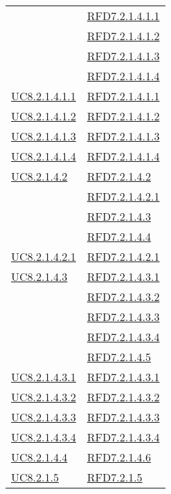 \begin{longtable}{|>{\centering}m{5cm}|m{5cm}<{\centering}|}
& \hyperlink{RFD7.2.1.4.1.1}{RFD7.2.1.4.1.1}\\
& \hyperlink{RFD7.2.1.4.1.2}{RFD7.2.1.4.1.2}\\
& \hyperlink{RFD7.2.1.4.1.3}{RFD7.2.1.4.1.3}\\
& \hyperlink{RFD7.2.1.4.1.4}{RFD7.2.1.4.1.4}\\ \hline
\hyperref[UC8.2.1.4.1.1]{UC8.2.1.4.1.1} & \hyperlink{RFD7.2.1.4.1.1}{RFD7.2.1.4.1.1}\\ \hline
\hyperref[UC8.2.1.4.1.2]{UC8.2.1.4.1.2} & \hyperlink{RFD7.2.1.4.1.2}{RFD7.2.1.4.1.2}\\ \hline
\hyperref[UC8.2.1.4.1.3]{UC8.2.1.4.1.3} & \hyperlink{RFD7.2.1.4.1.3}{RFD7.2.1.4.1.3}\\ \hline
\hyperref[UC8.2.1.4.1.4]{UC8.2.1.4.1.4} & \hyperlink{RFD7.2.1.4.1.4}{RFD7.2.1.4.1.4}\\ \hline
\hyperref[UC8.2.1.4.2]{UC8.2.1.4.2} & \hyperlink{RFD7.2.1.4.2}{RFD7.2.1.4.2}\\
& \hyperlink{RFD7.2.1.4.2.1}{RFD7.2.1.4.2.1}\\
& \hyperlink{RFD7.2.1.4.3}{RFD7.2.1.4.3}\\
& \hyperlink{RFD7.2.1.4.4}{RFD7.2.1.4.4}\\ \hline
\hyperref[UC8.2.1.4.2.1]{UC8.2.1.4.2.1} & \hyperlink{RFD7.2.1.4.2.1}{RFD7.2.1.4.2.1}\\ \hline
\hyperref[UC8.2.1.4.3]{UC8.2.1.4.3} & \hyperlink{RFD7.2.1.4.3.1}{RFD7.2.1.4.3.1}\\
& \hyperlink{RFD7.2.1.4.3.2}{RFD7.2.1.4.3.2}\\
& \hyperlink{RFD7.2.1.4.3.3}{RFD7.2.1.4.3.3}\\
& \hyperlink{RFD7.2.1.4.3.4}{RFD7.2.1.4.3.4}\\
& \hyperlink{RFD7.2.1.4.5}{RFD7.2.1.4.5}\\ \hline
\hyperref[UC8.2.1.4.3.1]{UC8.2.1.4.3.1} & \hyperlink{RFD7.2.1.4.3.1}{RFD7.2.1.4.3.1}\\ \hline
\hyperref[UC8.2.1.4.3.2]{UC8.2.1.4.3.2} & \hyperlink{RFD7.2.1.4.3.2}{RFD7.2.1.4.3.2}\\ \hline
\hyperref[UC8.2.1.4.3.3]{UC8.2.1.4.3.3} & \hyperlink{RFD7.2.1.4.3.3}{RFD7.2.1.4.3.3}\\ \hline
\hyperref[UC8.2.1.4.3.4]{UC8.2.1.4.3.4} & \hyperlink{RFD7.2.1.4.3.4}{RFD7.2.1.4.3.4}\\ \hline
\hyperref[UC8.2.1.4.4]{UC8.2.1.4.4} & \hyperlink{RFD7.2.1.4.6}{RFD7.2.1.4.6}\\ \hline
\hyperref[UC8.2.1.5]{UC8.2.1.5} & \hyperlink{RFD7.2.1.5}{RFD7.2.1.5}\\

\end{longtable}
